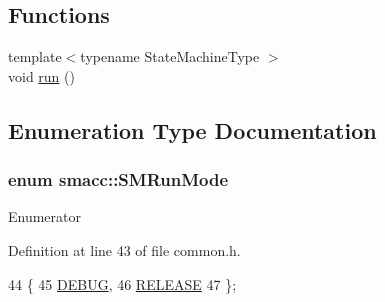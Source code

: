 \subsection*{Functions}
\begin{DoxyCompactItemize}
\item 
{\footnotesize template$<$typename State\+Machine\+Type $>$ }\\void \hyperlink{namespacesmacc_a47ac3b8d2968b1ba4152afd64ab66bd0}{run} ()
\end{DoxyCompactItemize}


\subsection{Enumeration Type Documentation}
\subsubsection[{\texorpdfstring{S\+M\+Run\+Mode}{SMRunMode}}]{\setlength{\rightskip}{0pt plus 5cm}enum {\bf smacc\+::\+S\+M\+Run\+Mode}\hspace{0.3cm}{\ttfamily [strong]}}\hypertarget{namespacesmacc_a3e4f79486ea6ea6342dd3c712d16a4f6}{}\label{namespacesmacc_a3e4f79486ea6ea6342dd3c712d16a4f6}
\begin{Desc}
\item[Enumerator]\par
\begin{description}
\item[{\em 
D\+E\+B\+UG\hypertarget{namespacesmacc_a3e4f79486ea6ea6342dd3c712d16a4f6adc30ec20708ef7b0f641ef78b7880a15}{}\label{namespacesmacc_a3e4f79486ea6ea6342dd3c712d16a4f6adc30ec20708ef7b0f641ef78b7880a15}
}]\item[{\em 
R\+E\+L\+E\+A\+SE\hypertarget{namespacesmacc_a3e4f79486ea6ea6342dd3c712d16a4f6a7d649ef069df9885e382417c79f3d5cd}{}\label{namespacesmacc_a3e4f79486ea6ea6342dd3c712d16a4f6a7d649ef069df9885e382417c79f3d5cd}
}]\end{description}
\end{Desc}


Definition at line 43 of file common.\+h.


\begin{DoxyCode}
44 \{
45   \hyperlink{namespacesmacc_a3e4f79486ea6ea6342dd3c712d16a4f6adc30ec20708ef7b0f641ef78b7880a15}{DEBUG},
46   \hyperlink{namespacesmacc_a3e4f79486ea6ea6342dd3c712d16a4f6a7d649ef069df9885e382417c79f3d5cd}{RELEASE}
47 \};
\end{DoxyCode}


